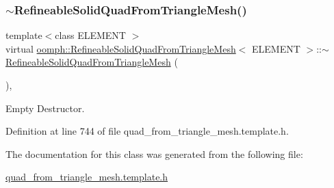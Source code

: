 \mbox{\label{classoomph_1_1RefineableSolidQuadFromTriangleMesh_a2b6bc173d4ef48f285f9cf7330db2878}} 
\subsubsection{\texorpdfstring{$\sim$\+Refineable\+Solid\+Quad\+From\+Triangle\+Mesh()}{~RefineableSolidQuadFromTriangleMesh()}}
{\footnotesize\ttfamily template$<$class E\+L\+E\+M\+E\+NT $>$ \\
virtual \hyperlink{classoomph_1_1RefineableSolidQuadFromTriangleMesh}{oomph\+::\+Refineable\+Solid\+Quad\+From\+Triangle\+Mesh}$<$ E\+L\+E\+M\+E\+NT $>$\+::$\sim$\hyperlink{classoomph_1_1RefineableSolidQuadFromTriangleMesh}{Refineable\+Solid\+Quad\+From\+Triangle\+Mesh} (\begin{DoxyParamCaption}{ }\end{DoxyParamCaption})\hspace{0.3cm}{\ttfamily [inline]}, {\ttfamily [virtual]}}



Empty Destructor. 



Definition at line 744 of file quad\+\_\+from\+\_\+triangle\+\_\+mesh.\+template.\+h.



The documentation for this class was generated from the following file\+:\begin{DoxyCompactItemize}
\item 
\hyperlink{quad__from__triangle__mesh_8template_8h}{quad\+\_\+from\+\_\+triangle\+\_\+mesh.\+template.\+h}\end{DoxyCompactItemize}
